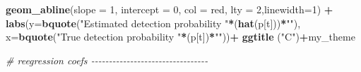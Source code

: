 \documentclass[
]{article}
\newenvironment{Shaded}{\begin{snugshade}}{\end{snugshade}}
\newcommand{\AttributeTok}[1]{\textcolor[rgb]{0.13,0.29,0.53}{#1}}
\newcommand{\CommentTok}[1]{\textcolor[rgb]{0.56,0.35,0.01}{\textit{#1}}}
\newcommand{\DecValTok}[1]{\textcolor[rgb]{0.00,0.00,0.81}{#1}}
\newcommand{\FunctionTok}[1]{\textcolor[rgb]{0.13,0.29,0.53}{\textbf{#1}}}
\newcommand{\NormalTok}[1]{#1}
\newcommand{\SpecialCharTok}[1]{\textcolor[rgb]{0.81,0.36,0.00}{\textbf{#1}}}
\newcommand{\StringTok}[1]{\textcolor[rgb]{0.31,0.60,0.02}{#1}}
\begin{document}
{\begin{Shaded}
\begin{Highlighting}[]
  \FunctionTok{geom\_abline}\NormalTok{(}\AttributeTok{slope =} \DecValTok{1}\NormalTok{, }\AttributeTok{intercept =} \DecValTok{0}\NormalTok{, }\AttributeTok{col =} \StringTok{\textquotesingle{}red\textquotesingle{}}\NormalTok{, }\AttributeTok{lty =} \DecValTok{2}\NormalTok{,}\AttributeTok{linewidth=}\DecValTok{1}\NormalTok{) }\SpecialCharTok{+}
  \FunctionTok{labs}\NormalTok{(}\AttributeTok{y=}\FunctionTok{bquote}\NormalTok{(}\StringTok{"Estimated detection probability "}\SpecialCharTok{*}\NormalTok{(}\FunctionTok{hat}\NormalTok{(p[t]))}\SpecialCharTok{*}\StringTok{""}\NormalTok{),}
       \AttributeTok{x=}\FunctionTok{bquote}\NormalTok{(}\StringTok{"True detection probability "}\SpecialCharTok{*}\NormalTok{(p[t])}\SpecialCharTok{*}\StringTok{""}\NormalTok{))}\SpecialCharTok{+}
  \FunctionTok{ggtitle}\NormalTok{ (}\StringTok{"C"}\NormalTok{)}\SpecialCharTok{+}\NormalTok{my\_theme}


\CommentTok{\# reegression coefs {-}{-}{-}{-}{-}{-}{-}{-}{-}{-}{-}{-}{-}{-}{-}{-}{-}{-}{-}{-}{-}{-}{-}{-}{-}{-}{-}{-}{-}{-}{-}{-}{-}}


\end{Highlighting}
\end{Shaded}}
\end{document}
